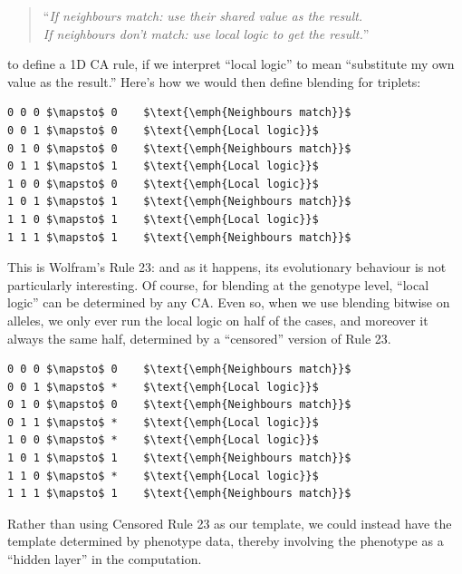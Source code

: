 \documentclass{AISB2008}
\begin{document}
\begin{quote}
``\emph{If neighbours match:} \emph{use their shared value as the result.}\\
 \emph{If neighbours don't match:} \emph{use local logic to get the result.}''
\end{quote}

\noindent to define a 1D CA rule, if we interpret ``local logic'' to
mean ``substitute my own value as the result.''  Here's how we would
then define blending for triplets:

\lstset{
  xleftmargin=.2\columnwidth, xrightmargin=.01\columnwidth
}

\begin{lstlisting}[mathescape]
0 0 0 $\mapsto$ 0    $\text{\emph{Neighbours match}}$
0 0 1 $\mapsto$ 0    $\text{\emph{Local logic}}$
0 1 0 $\mapsto$ 0    $\text{\emph{Neighbours match}}$
0 1 1 $\mapsto$ 1    $\text{\emph{Local logic}}$
1 0 0 $\mapsto$ 0    $\text{\emph{Local logic}}$
1 0 1 $\mapsto$ 1    $\text{\emph{Neighbours match}}$
1 1 0 $\mapsto$ 1    $\text{\emph{Local logic}}$
1 1 1 $\mapsto$ 1    $\text{\emph{Neighbours match}}$
\end{lstlisting}

This is Wolfram's Rule 23: and as it happens, its evolutionary
behaviour is not particularly interesting.  Of course, for blending at
the genotype level, ``local logic'' can be determined by any CA.  Even
so, when we use blending bitwise on alleles, we only ever run the
local logic on half of the cases, and moreover it always the same
half, determined by a ``censored'' version of Rule 23.

\begin{lstlisting}[mathescape]
0 0 0 $\mapsto$ 0    $\text{\emph{Neighbours match}}$
0 0 1 $\mapsto$ *    $\text{\emph{Local logic}}$
0 1 0 $\mapsto$ 0    $\text{\emph{Neighbours match}}$
0 1 1 $\mapsto$ *    $\text{\emph{Local logic}}$
1 0 0 $\mapsto$ *    $\text{\emph{Local logic}}$
1 0 1 $\mapsto$ 1    $\text{\emph{Neighbours match}}$
1 1 0 $\mapsto$ *    $\text{\emph{Local logic}}$
1 1 1 $\mapsto$ 1    $\text{\emph{Neighbours match}}$
\end{lstlisting}

Rather than using Censored Rule 23 as our template, we could instead
have the template determined by phenotype data, thereby involving the
phenotype as a ``hidden layer'' in the computation.
\end{document}
